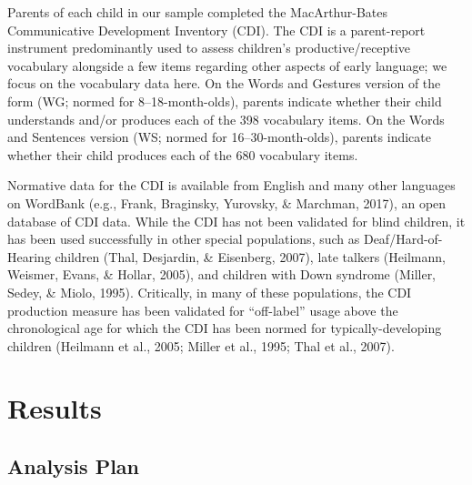 \documentclass[english,man,floatsintext]{apa6}
\begin{document}
Parents of each child in our sample completed the MacArthur-Bates Communicative Development Inventory (CDI). The CDI is a parent-report instrument predominantly used to assess children's productive/receptive vocabulary alongside a few items regarding other aspects of early language; we focus on the vocabulary data here. On the Words and Gestures version of the form (WG; normed for 8--18-month-olds), parents indicate whether their child understands and/or produces each of the 398 vocabulary items. On the Words and Sentences version (WS; normed for 16--30-month-olds), parents indicate whether their child produces each of the 680 vocabulary items.

Normative data for the CDI is available from English and many other languages on WordBank (e.g., Frank, Braginsky, Yurovsky, \& Marchman, 2017), an open database of CDI data. While the CDI has not been validated for blind children, it has been used successfully in other special populations, such as Deaf/Hard-of-Hearing children (Thal, Desjardin, \& Eisenberg, 2007), late talkers (Heilmann, Weismer, Evans, \& Hollar, 2005), and children with Down syndrome (Miller, Sedey, \& Miolo, 1995). Critically, in many of these populations, the CDI production measure has been validated for \enquote{off-label} usage above the chronological age for which the CDI has been normed for typically-developing children (Heilmann et al., 2005; Miller et al., 1995; Thal et al., 2007).

\hypertarget{results}{%
\section{Results}\label{results}}

\hypertarget{analysis-plan}{%
\subsection{Analysis Plan}\label{analysis-plan}}
\end{document}
